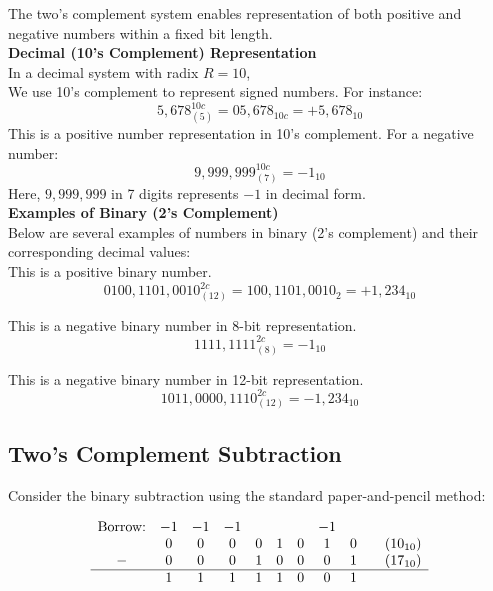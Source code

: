 The two's complement system enables representation of both positive and negative numbers within a fixed bit length. \\
\vspace*{5px}
\textbf{Decimal (10's Complement) Representation} \\
\vspace*{2px}
In a decimal system with radix $R = 10$,\\
We use 10's complement to represent signed numbers. For instance: \\
\[
5,678_{(5)}^{10c} = 05,678_{10c} = +5,678_{10}
\]
This is a positive number representation in 10's complement. For a negative number: \\

\[
9,999,999_{(7)}^{10c} = -1_{10}
\]
Here, $9,999,999$ in 7 digits represents $-1$ in decimal form. \\
\vspace*{5px}
\textbf{Examples of Binary (2's Complement)} \\
\vspace*{2px}
Below are several examples of numbers in binary (2's complement) and their corresponding decimal values: \\
This is a positive binary number. \\
\[
0100,1101,0010_{(12)}^{2c} = 100,1101,0010_2 = +1,234_{10}
\]

This is a negative binary number in 8-bit representation.\\
\[
1111,1111_{(8)}^{2c} = -1_{10}
\]

This is a negative binary number in 12-bit representation.\\
\[
1011,0000,1110_{(12)}^{2c} = -1,234_{10}
\]
\vspace*{5px}

\subsection{Two's Complement Subtraction}

Consider the binary subtraction using the standard paper-and-pencil method:

\[
\begin{array}{cccccccccc}
\text{Borrow:} & -1 & -1 & -1 & & & & -1 & & \\
& 0 & 0 & 0 & 0 & 1 & 0 & 1 & 0 & \quad (10_{10}) \\
- & 0 & 0 & 0 & 1 & 0 & 0 & 0 & 1 & \quad (17_{10}) \\
\hline
  & 1 & 1 & 1 & 1 & 1 & 0 & 0 & 1 \\
\end{array}
\]


